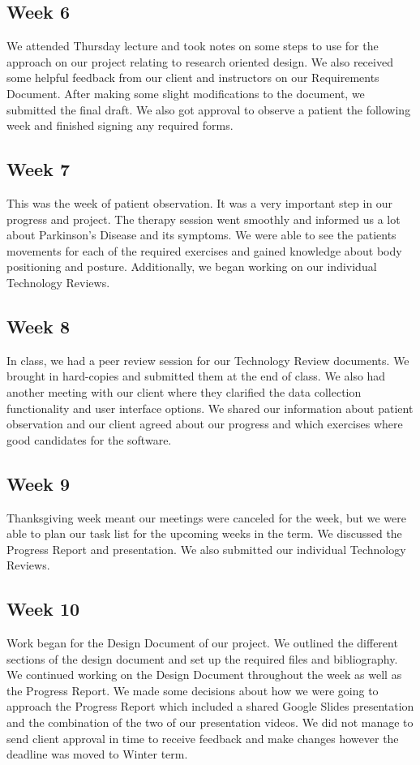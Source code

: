 \documentclass[onecolumn, draftclsnofoot,10pt, compsoc]{IEEEtran}
\begin{document}
\subsection{Week 6}
We attended Thursday lecture and took notes on some steps to use for the approach on our project relating to research oriented design. We also received some helpful feedback from our client and instructors on our Requirements Document. After making some slight modifications to the document, we submitted the final draft. We also got approval to observe a patient the following week and finished signing any required forms.  

\subsection{Week 7}
This was the week of patient observation. It was a very important step in our progress and project. The therapy session went smoothly and informed us a lot about Parkinson's  Disease and its symptoms. We were able to see the patients movements for each of the required exercises and gained knowledge about body positioning and posture. Additionally, we began working on our individual Technology Reviews.      

\subsection{Week 8}
In class, we had a peer review session for our Technology Review documents. We brought in hard-copies and submitted them at the end of class. We also had another meeting with our client where they clarified the data collection functionality and user interface options. We shared our information about patient observation and our client agreed about our progress and which exercises where good candidates for the software.  

\subsection{Week 9}
Thanksgiving week meant our meetings were canceled for the week, but we were able to plan our task list for the upcoming weeks in the term. We discussed the Progress Report and presentation. We also submitted our individual Technology Reviews. 

\subsection{Week 10}
Work began for the Design Document of our project. We outlined the different sections of the design document and set up the required files and bibliography. We continued working on the Design Document throughout the week as well as the Progress Report. We made some decisions about how we were going to approach the Progress Report which included a shared Google Slides presentation and the combination of the two of our presentation videos. We did not manage to send client approval in time to receive feedback and make changes however the deadline was moved to Winter term. 
\end{document}
